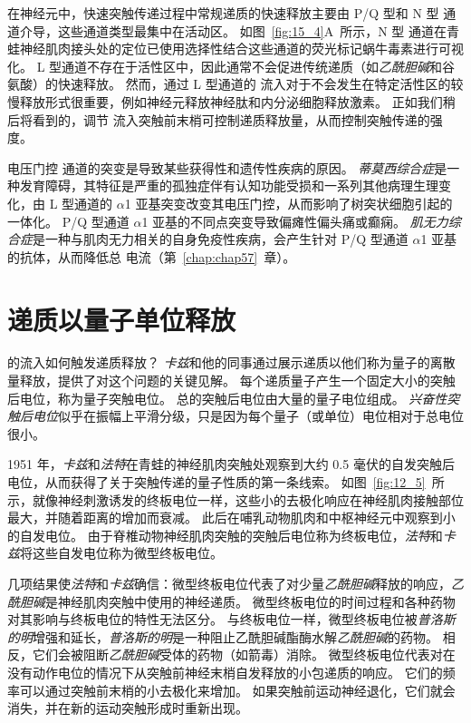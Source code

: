 在神经元中，快速突触传递过程中常规递质的快速释放主要由 P/Q 型和 N 型  通道介导，这些通道类型最集中在活动区。
如图~\ref{fig:15_4}A~所示，N 型  通道在青蛙神经肌肉接头处的定位已使用选择性结合这些通道的荧光标记蜗牛毒素进行可视化。
L 型通道不存在于活性区中，因此通常不会促进传统递质（如\textit{乙酰胆碱}和谷氨酸）的快速释放。
然而，通过 L 型通道的  流入对于不会发生在特定活性区的较慢释放形式很重要，例如神经元释放神经肽和内分泌细胞释放激素。
正如我们稍后将看到的，调节  流入突触前末梢可控制递质释放量，从而控制突触传递的强度。


电压门控  通道的突变是导致某些获得性和遗传性疾病的原因。
\textit{蒂莫西综合症}是一种发育障碍，其特征是严重的孤独症伴有认知功能受损和一系列其他病理生理变化，由 L 型通道的 $\alpha$1 亚基突变改变其电压门控，从而影响了树突状细胞引起的一体化。
P/Q 型通道 $\alpha$1 亚基的不同点突变导致偏瘫性偏头痛或癫痫。
\textit{肌无力综合症}是一种与肌肉无力相关的自身免疫性疾病，会产生针对 P/Q 型通道 $\alpha$1 亚基的抗体，从而降低总  电流（第~\ref{chap:chap57}~章）。



\section{递质以量子单位释放}

的流入如何触发递质释放？
\textit{卡兹}和他的同事通过展示递质以他们称为量子的离散量释放，提供了对这个问题的关键见解。
每个递质量子产生一个固定大小的突触后电位，称为量子突触电位。
总的突触后电位由大量的量子电位组成。
\textit{兴奋性突触后电位}似乎在振幅上平滑分级，只是因为每个量子（或单位）电位相对于总电位很小。


1951 年，\textit{卡兹}和\textit{法特}在青蛙的神经肌肉突触处观察到大约 0.5 毫伏的自发突触后电位，从而获得了关于突触传递的量子性质的第一条线索。
如图~\ref{fig:12_5}~所示，就像神经刺激诱发的终板电位一样，这些小的去极化响应在神经肌肉接触部位最大，并随着距离的增加而衰减。
此后在哺乳动物肌肉和中枢神经元中观察到小的自发电位。
由于脊椎动物神经肌肉突触的突触后电位称为终板电位，\textit{法特}和\textit{卡兹}将这些自发电位称为微型终板电位。


几项结果使\textit{法特}和\textit{卡兹}确信：微型终板电位代表了对少量\textit{乙酰胆碱}释放的响应，\textit{乙酰胆碱}是神经肌肉突触中使用的神经递质。
微型终板电位的时间过程和各种药物对其影响与终板电位的特性无法区分。
与终板电位一样，微型终板电位被\textit{普洛斯的明}增强和延长，\textit{普洛斯的明}是一种阻止乙酰胆碱酯酶水解\textit{乙酰胆碱}的药物。
相反，它们会被阻断\textit{乙酰胆碱}受体的药物（如箭毒）消除。 
微型终板电位代表对在没有动作电位的情况下从突触前神经末梢自发释放的小包递质的响应。
它们的频率可以通过突触前末梢的小去极化来增加。
如果突触前运动神经退化，它们就会消失，并在新的运动突触形成时重新出现。


